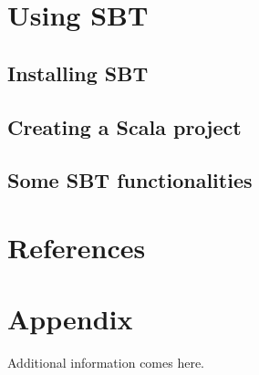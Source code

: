 \documentclass{article}
\begin{document}
\section{Using SBT}
\subsection{Installing SBT}
\subsection{Creating a Scala project}
\subsection{Some SBT functionalities}
\section{References}

\section{Appendix}
\begin{appendix}

Additional information comes here.
\listoffigures
\listoftables

\end{appendix}

  
\end{document}
